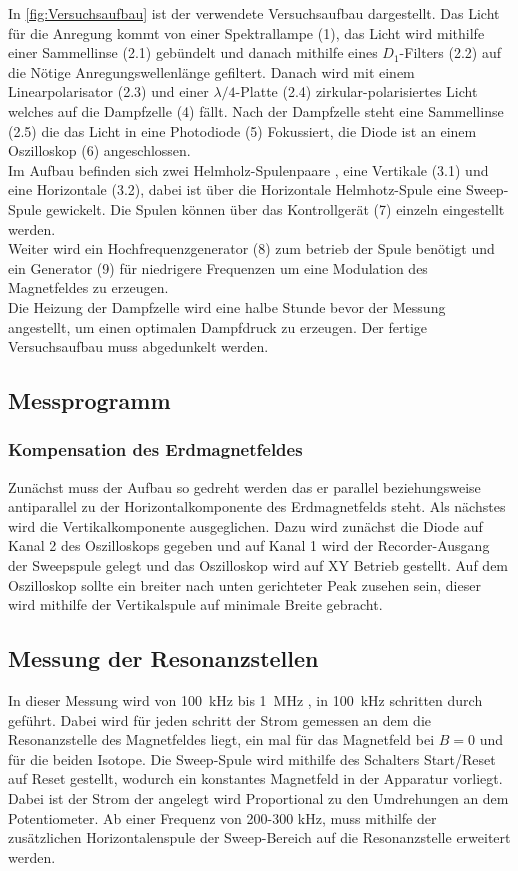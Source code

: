 In \cref{fig:Versuchsaufbau} ist der verwendete Versuchsaufbau dargestellt.
Das Licht für die Anregung kommt von einer Spektrallampe (1), das Licht wird mithilfe einer Sammellinse (2.1) gebündelt und danach mithilfe eines $D_1$-Filters (2.2) auf die Nötige Anregungswellenlänge gefiltert. 
Danach wird mit einem Linearpolarisator (2.3) und einer $\lambda/4$-Platte (2.4) zirkular-polarisiertes Licht welches auf die Dampfzelle (4) fällt. Nach der Dampfzelle steht eine Sammellinse (2.5) die das Licht in eine Photodiode (5) Fokussiert, die Diode ist an einem Oszilloskop (6) angeschlossen.\\
Im Aufbau befinden sich zwei Helmholz-Spulenpaare , eine Vertikale (3.1) und eine Horizontale (3.2), dabei ist über die Horizontale Helmhotz-Spule eine Sweep-Spule gewickelt.
Die Spulen können über das Kontrollgerät (7) einzeln eingestellt werden.\\
Weiter wird ein Hochfrequenzgenerator (8) zum betrieb der Spule benötigt und ein Generator (9) für niedrigere Frequenzen um eine Modulation des Magnetfeldes zu erzeugen.\\
Die Heizung der Dampfzelle wird eine halbe Stunde bevor der Messung angestellt, um einen optimalen Dampfdruck zu erzeugen.
Der fertige Versuchsaufbau muss abgedunkelt werden.\\
\subsection{Messprogramm}
\subsubsection{Kompensation des Erdmagnetfeldes}
Zunächst muss der Aufbau so gedreht werden das er parallel beziehungsweise antiparallel zu der Horizontalkomponente des Erdmagnetfelds steht. 
Als nächstes wird die Vertikalkomponente ausgeglichen.
Dazu wird zunächst die Diode auf Kanal 2 des Oszilloskops gegeben und auf Kanal 1 wird der Recorder-Ausgang der Sweepspule gelegt und das Oszilloskop wird auf XY Betrieb gestellt.
Auf dem Oszilloskop sollte ein breiter nach unten gerichteter Peak zusehen sein, dieser wird mithilfe der Vertikalspule auf minimale Breite gebracht.
\subsection{Messung der Resonanzstellen}
In dieser Messung wird von \SI{100}{\kilo\hertz} bis \SI{1}{\mega\hertz} , in \SI{100}{\kilo\hertz} schritten durch geführt.
Dabei wird für jeden schritt der Strom gemessen an dem die Resonanzstelle des Magnetfeldes liegt, ein mal für das Magnetfeld bei $B=0$ und für die beiden Isotope.
Die Sweep-Spule wird mithilfe des Schalters Start/Reset auf Reset gestellt, wodurch ein konstantes Magnetfeld in der Apparatur vorliegt.
Dabei ist der Strom der angelegt wird Proportional zu den Umdrehungen an dem Potentiometer.
Ab einer Frequenz von 200-300 \si{\kilo\hertz}, muss mithilfe der zusätzlichen Horizontalenspule der Sweep-Bereich auf die Resonanzstelle erweitert werden.
\newpage
